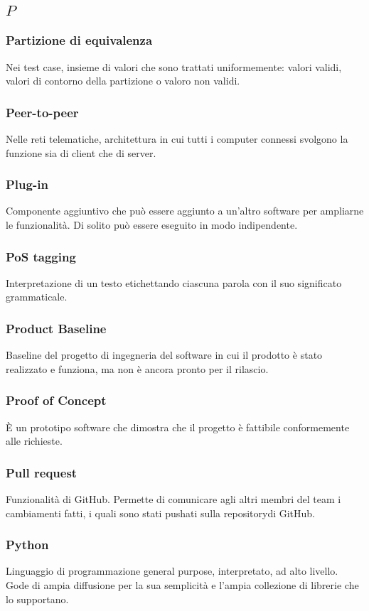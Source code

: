 \subsection*{\quad$P\quad$}
\subsubsection*{Partizione di equivalenza}
Nei test case, insieme di valori che sono trattati uniformemente: valori validi, valori di contorno della partizione o valoro non validi.

\subsubsection*{Peer-to-peer}
Nelle reti telematiche, architettura in cui tutti i computer connessi svolgono la funzione sia di client che di server.

\subsubsection*{Plug-in}
Componente aggiuntivo che può essere aggiunto a un'altro software per ampliarne le funzionalità. Di solito può essere eseguito in modo indipendente.

\subsubsection*{PoS tagging}
Interpretazione di un testo etichettando ciascuna parola con il suo significato grammaticale.

\subsubsection*{Product Baseline}
Baseline del progetto di ingegneria del software in cui il prodotto è stato realizzato e funziona, ma non è ancora pronto per il rilascio.

\subsubsection*{Proof of Concept}
È un prototipo software che dimostra che il progetto è fattibile conformemente alle richieste.

\subsubsection*{Pull request}
Funzionalità di GitHub. Permette di comunicare agli altri membri del team i cambiamenti fatti, i  quali sono stati pushati sulla repository\glosp di GitHub.

\subsubsection*{Python}
Linguaggio di programmazione general purpose, interpretato, ad alto livello. Gode di ampia diffusione per la sua semplicità e l'ampia collezione di librerie che lo supportano.

